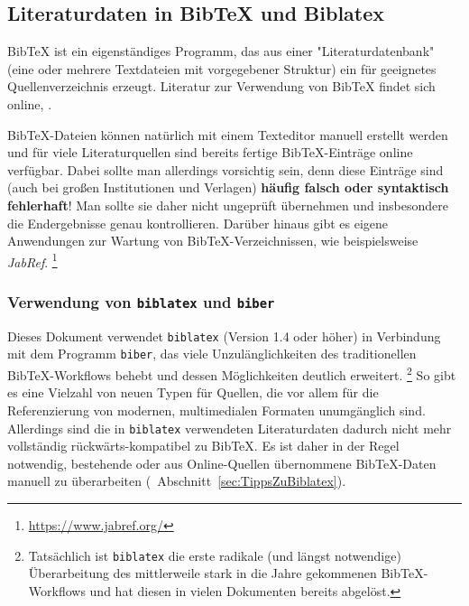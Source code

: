 \subsection{Literaturdaten in BibTeX und Biblatex}
\label{sec:bibtex}

BibTeX ist ein eigenständiges Programm, das aus einer "Literaturdatenbank"
(eine oder mehrere Textdateien mit vorgegebener Struktur) ein für \latex
geeignetes Quellenverzeichnis erzeugt. Literatur zur Verwendung von BibTeX
findet sich online, \zB \cite{Feder2006, Patashnik1988}.

BibTeX-Dateien können natürlich mit einem Texteditor manuell erstellt werden
und für viele Literaturquellen sind bereits fertige BibTeX-Einträge online
verfügbar. Dabei sollte man allerdings vorsichtig sein, denn diese Einträge
sind (auch bei großen Institutionen und Verlagen) \textbf{häufig falsch oder
syntaktisch fehlerhaft}! Man sollte sie daher nicht ungeprüft übernehmen und
insbesondere die Endergebnisse genau kontrollieren. Darüber hinaus gibt es
eigene Anwendungen zur Wartung von BibTeX-Verzeichnissen, wie beispielsweise
\emph{JabRef}.%
\footnote{\url{https://www.jabref.org/}}


\subsubsection{Verwendung von \texttt{biblatex} und \texttt{biber}}

Dieses Dokument verwendet \texttt{biblatex} (Version 1.4 oder höher) in
Verbindung mit dem Programm \texttt{biber}, das viele Unzulänglichkeiten des
traditionellen BibTeX-Workflows behebt und dessen Möglichkeiten deutlich
erweitert.%
\footnote{Tatsächlich ist \texttt{biblatex} die erste radikale (und längst
notwendige) Überarbeitung des mittlerweile stark in die Jahre gekommenen
BibTeX-Workflows und hat diesen in vielen Dokumenten bereits abgelöst.}
So gibt es eine Vielzahl von neuen Typen für Quellen, die vor allem für die
Referenzierung von modernen, multimedialen Formaten unumgänglich sind.
Allerdings sind die in \texttt{biblatex} verwendeten Literaturdaten dadurch
nicht mehr vollständig rückwärts-kompatibel zu BibTeX. Es ist daher in der
Regel notwendig, bestehende oder aus Online-Quellen übernommene BibTeX-Daten
manuell zu überarbeiten (\sa\ Abschnitt~\ref{sec:TippsZuBiblatex}).

